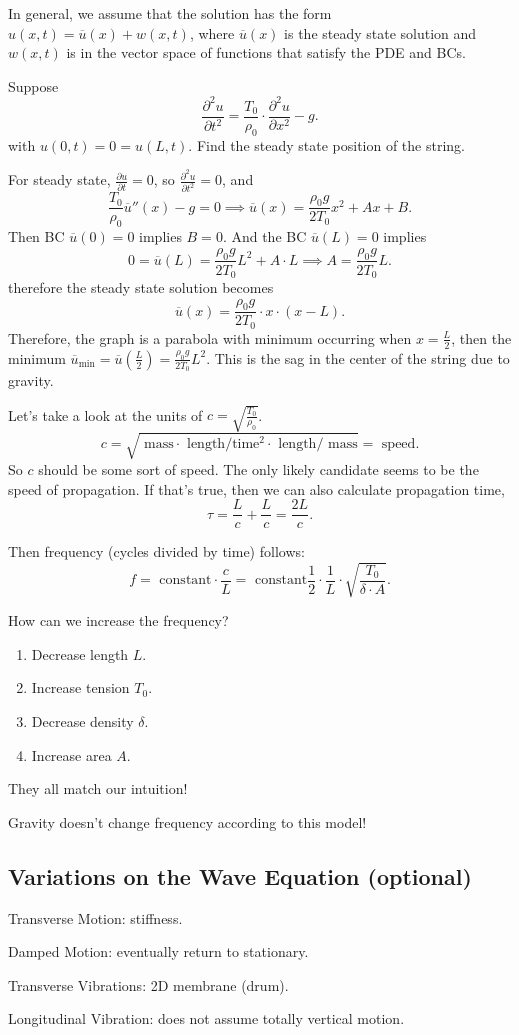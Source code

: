 \documentclass[class=article,crop=false]{standalone}
\begin{document}
In general, we assume that the solution has the form $ u(x,t) = \overline{u}(x) + w(x,t)$, where $ \overline{u}(x)$ is the steady state solution and $ w(x,t)$ is in the vector space of functions that satisfy the PDE and BCs.

\begin{eg}[]
Suppose
\[
\frac{\partial^2 u}{\partial { t}^2} = \frac{T_0}{\rho_0} \cdot \frac{\partial^2 u}{\partial { x}^2} - g
.\] 
with $ u(0,t)=0=u(L,t)$. Find the steady state position of the string.

For steady state, $ \frac{\partial u}{\partial t} =0$, so $ \frac{\partial^2 u}{\partial { t}^2}=0 $, and
\[
	\frac{T_0}{\rho_0} \overline{u}''(x) - g=0 \implies \overline{u}(x) = \frac{\rho_0 g}{2 T_0 }x^2 + A x + B
.\] 
Then BC $ \overline{u}(0)=0$ implies $ B =0$. And the BC $ \overline{u}(L)=0$ implies
\[
	0=\overline{u}(L) = \frac{\rho_0 g}{2 T_0 } L^2 + A \cdot L \implies A = \frac{\rho_0 g}{2T_0 }L
.\] 
therefore the steady state solution becomes
\[
	\overline{u}(x) = \frac{\rho_0 g}{2 T_0 } \cdot x \cdot (x-L)
.\] 
Therefore, the graph is a parabola with minimum occurring when $ x=\frac{L}{2}$, then the minimum $ \overline{u}_{\min} = \overline{u}\left( \frac{L}{2} \right)  = \frac{\rho_0 g}{2 T_0 }L^2$. This is the sag in the center of the string due to gravity. 
\end{eg}

\begin{intuition}
	Let's take a look at the units of $ c = \sqrt{\frac{T_0}{\rho_0}} $. 
	\[
		c = \sqrt{ \text{ mass} \cdot \text{ length} / \text{time}^2 \cdot \text{ length} / \text{ mass}    } = \text{ speed} 
	.\] 
So $ c$ should be some sort of speed. The only likely candidate seems to be the speed of propagation. 
If that's true, then we can also calculate propagation time,
\[
\tau = \frac{L}{c} + \frac{L}{c} = \frac{2L}{c }
.\] 

Then frequency (cycles divided by time) follows:
\[
f = \text{ constant} \cdot  \frac{c}{L} = \text{ constant}\frac{1}{2 } \cdot \frac{1}{L} \cdot \sqrt{\frac{T_0}{\delta \cdot A}}   
.\] 

How can we increase the frequency?

\begin{enumerate}[label=\arabic*)]
	\item Decrease length $ L$.
	\item Increase tension  $ T_0$.
	\item Decrease density $ \delta$.
	\item Increase area $ A$.
\end{enumerate}
They all match our intuition!

\begin{note}[]
Gravity doesn't change frequency according to this model!
\end{note}
\end{intuition}

\subsection{Variations on the Wave Equation (optional)} 
Transverse Motion: stiffness.

Damped Motion: eventually return to stationary.

Transverse Vibrations: 2D membrane (drum).

Longitudinal Vibration: does not assume totally vertical motion.
\end{document}
